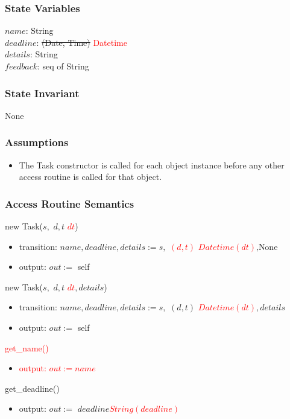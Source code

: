 \documentclass[12pt, titlepage]{article}
\begin{document}
\subsubsection*{State Variables}
$name$: String\\
$deadline$: \sout{(Date, Time)} \textcolor{red}{Datetime}\\
$details$: String\\
$feedback$: seq of String

\subsubsection*{State Invariant}
None

\subsubsection*{Assumptions}
\begin{itemize}
  \item The Task constructor is called for each object instance before any other access routine is called for that object.
\end{itemize}

\subsubsection*{Access Routine Semantics}
\noindent new Task($s,$ \sout{$d, t$} \textcolor{red}{$dt$})
\begin{itemize}
    \item transition: $name, deadline, details := s,$ \textcolor{red}{\sout{$(d, t)$} $Datetime(dt)$}$, \text{None}$
    \item output: $out :=$ self
\end{itemize}

\noindent new Task($s,$ \sout{$d, t$} \textcolor{red}{$dt$}$, details$)
\begin{itemize}
    \item transition: $name, deadline, details := s,$ \sout{$(d, t)$} \textcolor{red}{$Datetime(dt)$}$, details$
    \item output: $out :=$ self
\end{itemize}

\noindent \textcolor{red}{get\_name()}
\begin{itemize}
    \item \textcolor{red}{output: $out := name$}
\end{itemize}

\noindent get\_deadline()
\begin{itemize}
    \item output: $out :=$ \sout{$deadline$}\textcolor{red}{$String(deadline)$}
\end{itemize}
\end{document}
